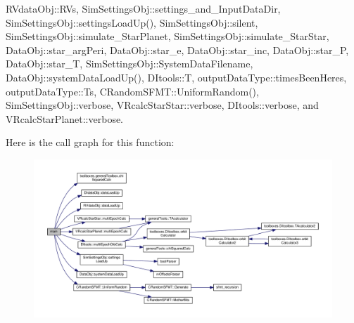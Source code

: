 R\-Vdata\-Obj\-::\-R\-Vs, Sim\-Settings\-Obj\-::settings\-\_\-and\-\_\-\-Input\-Data\-Dir, Sim\-Settings\-Obj\-::settings\-Load\-Up(), Sim\-Settings\-Obj\-::silent, Sim\-Settings\-Obj\-::simulate\-\_\-\-Star\-Planet, Sim\-Settings\-Obj\-::simulate\-\_\-\-Star\-Star, Data\-Obj\-::star\-\_\-arg\-Peri, Data\-Obj\-::star\-\_\-e, Data\-Obj\-::star\-\_\-inc, Data\-Obj\-::star\-\_\-\-P, Data\-Obj\-::star\-\_\-\-T, Sim\-Settings\-Obj\-::\-System\-Data\-Filename, Data\-Obj\-::system\-Data\-Load\-Up(), D\-Itools\-::\-T, output\-Data\-Type\-::times\-Been\-Heres, output\-Data\-Type\-::\-Ts, C\-Random\-S\-F\-M\-T\-::\-Uniform\-Random(), Sim\-Settings\-Obj\-::verbose, V\-Rcalc\-Star\-Star\-::verbose, D\-Itools\-::verbose, and V\-Rcalc\-Star\-Planet\-::verbose.



Here is the call graph for this function\-:\nopagebreak
\begin{figure}[H]
\begin{center}
\leavevmode
\includegraphics[width=350pt]{mc_o_n_l_yorb_simulator_8cpp_a0ddf1224851353fc92bfbff6f499fa97_cgraph}
\end{center}
\end{figure}


